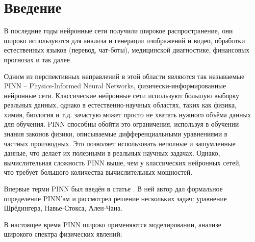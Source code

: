 \documentclass[a4paper,14pt]{extarticle} %
\author{Кузнецов Игорь}
\title{}
\date{\today}
\def\oldcite{} \let\oldcite=\cite
\def\cite{\stepcounter{citesnum}\oldcite}
\begin{document}
\newcommand{\brv}[1]{{\left| #1 \right|}}
\newcommand{\brr}[1]{{\left( #1 \right)}}
\newcommand{\brs}[1]{{\left[ #1 \right]}}
\newcommand{\brc}[1]{{\left\{ #1 \right\}}}
\newcommand{\brn}[1]{{\left\lVert #1 \right\rVert}}
\newcommand{\bra}[1]{{\left\langle #1 \right\rangle}}
\newcommand{\brrl}[1]{{\left( #1 \right]}}
            \newcommand{\brrr}[1]{{\left[ #1 \right)}}
\newcommand{\under}[2]{{\underset{#2}{\underbrace{#1}}}}
\newcommand{\strm}[1]{\underset{#1}{\rightarrow}}




\tableofcontents
\newpage

% 

\section{Введение}

В последние годы нейронные сети получили широкое распространение, они широко используются для анализа и генерации изображений и видео, обработки естественных языков (перевод, чат-боты), медицинской диагностике, финансовых прогнозах и так далее.

Одним из перспективных направлений в этой области являются так называемые PINN -- Physics-Informed Neural Networks, физически-инфор\-мированные нейронные сети. Классические нейронные сети используют большую выборку реальных данных, однако в естественно-научных областях, таких как физика, химия, биология и т.д. зачастую может просто не хватать нужного объёма данных для обучения. PINN способны обойти это ограничения, используя в обучении знания законов физики, описываемые дифференциальными уравнениями в частных производных. Это позволяет использовать неполные и зашумленные данные, что делает их полезными в реальных научных задачах. Однако, вычислительная сложность PINN выше, чем у классических нейронных сетей, что требует большого количества вычислительных мощностей.

Впервые терми PINN был введён в статье \cite{bib:pinn:first}. В ней автор дал формальное определение PINN'ам и рассмотрел решение нескольких задач: уравнение Шрёдингера, Навье-Стокса, Ален-Чана.

В настоящее время PINN широко применяются моделировании, анализе широкого спектра физических явлений:
\end{document}
